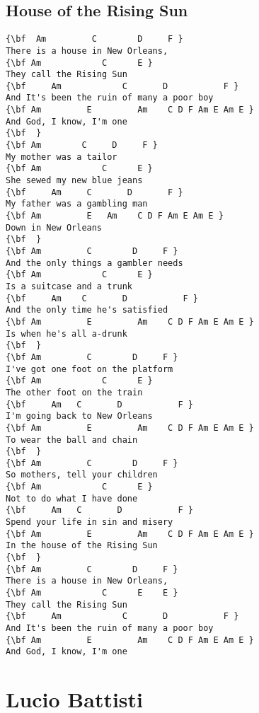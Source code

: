 \documentclass[a4paper]{article}
\begin{document}
\subsection{House of the Rising Sun} %
\label{sub:House of the Rising Su}
\begin{Verbatim}[commandchars=\\\{\}]
{\bf  Am         C        D     F }
There is a house in New Orleans, 
{\bf Am            C      E }
They call the Rising Sun 
{\bf     Am            C       D           F }
And It's been the ruin of many a poor boy 
{\bf Am         E         Am    C D F Am E Am E }
And God, I know, I'm one 
{\bf  }
{\bf Am        C     D     F }
My mother was a tailor 
{\bf Am            C      E }
She sewed my new blue jeans 
{\bf     Am     C       D       F }
My father was a gambling man 
{\bf Am         E   Am    C D F Am E Am E }
Down in New Orleans 
{\bf  }
{\bf Am         C        D     F }
And the only things a gambler needs 
{\bf Am            C      E }
Is a suitcase and a trunk 
{\bf     Am    C       D           F }
And the only time he's satisfied 
{\bf Am         E         Am    C D F Am E Am E }
Is when he's all a-drunk 
{\bf  }
{\bf Am         C        D     F }
I've got one foot on the platform 
{\bf Am            C      E }
The other foot on the train 
{\bf     Am   C       D           F }
I'm going back to New Orleans 
{\bf Am         E         Am    C D F Am E Am E }
To wear the ball and chain 
{\bf  }
{\bf Am         C        D     F }
So mothers, tell your children 
{\bf Am            C      E }
Not to do what I have done 
{\bf     Am   C       D           F }
Spend your life in sin and misery 
{\bf Am         E         Am    C D F Am E Am E }
In the house of the Rising Sun 
{\bf  }
{\bf Am         C        D     F }
There is a house in New Orleans, 
{\bf Am            C      E    E }
They call the Rising Sun 
{\bf     Am            C       D           F }
And It's been the ruin of many a poor boy 
{\bf Am         E         Am    C D F Am E Am E }
And God, I know, I'm one 
\end{Verbatim}
\newpage
\section{Lucio Battisti} %
\label{sec:Lucio Battisti}
\end{document}
